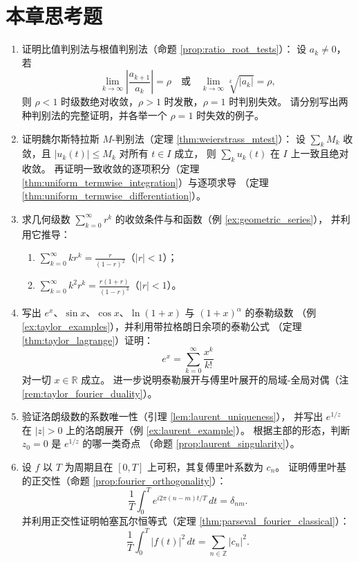\section*{本章思考题}

\begin{enumerate}[leftmargin=3em, label=\textbf{题 \arabic*}]
    \item 证明比值判别法与根值判别法（命题 \ref{prop:ratio_root_tests}）：
    设 $a_k\neq0$，若
    \[
    \lim_{k\to\infty}\left|\frac{a_{k+1}}{a_k}\right|=\rho
    \quad\text{或}\quad
    \lim_{k\to\infty}\sqrt[k]{|a_k|}=\rho,
    \]
    则 $\rho<1$ 时级数绝对收敛，$\rho>1$ 时发散，$\rho=1$ 时判别失效。
    请分别写出两种判别法的完整证明，并各举一个 $\rho=1$ 时失效的例子。

    \item 证明魏尔斯特拉斯 $M$-判别法（定理 \ref{thm:weierstrass_mtest}）：
    设 $\sum_k M_k$ 收敛，且 $|u_k(t)|\le M_k$ 对所有 $t\in I$ 成立，
    则 $\sum_k u_k(t)$ 在 $I$ 上一致且绝对收敛。
    再证明一致收敛的逐项积分（定理 \ref{thm:uniform_termwise_integration}）与逐项求导
    （定理 \ref{thm:uniform_termwise_differentiation}）。

    \item 求几何级数 $\sum_{k=0}^{\infty}r^k$ 的收敛条件与和函数（例 \ref{ex:geometric_series}），
    并利用它推导：
    \begin{enumerate}[label=(\roman*)]
        \item $\displaystyle \sum_{k=0}^{\infty}kr^k=\frac{r}{(1-r)^2}$（$|r|<1$）；
        \item $\displaystyle \sum_{k=0}^{\infty}k^2r^k=\frac{r(1+r)}{(1-r)^3}$（$|r|<1$）。
    \end{enumerate}

    \item 写出 $e^x$、$\sin x$、$\cos x$、$\ln(1+x)$ 与 $(1+x)^\alpha$ 的泰勒级数
    （例 \ref{ex:taylor_examples}），并利用带拉格朗日余项的泰勒公式
    （定理 \ref{thm:taylor_lagrange}）证明：
    \[
    e^x=\sum_{k=0}^{\infty}\frac{x^k}{k!}
    \]
    对一切 $x\in\mathbb{R}$ 成立。
    进一步说明泰勒展开与傅里叶展开的局域-全局对偶（注 \ref{rem:taylor_fourier_duality}）。

    \item 验证洛朗级数的系数唯一性（引理 \ref{lem:laurent_uniqueness}），
    并写出 $e^{1/z}$ 在 $|z|>0$ 上的洛朗展开（例 \ref{ex:laurent_example}）。
    根据主部的形态，判断 $z_0=0$ 是 $e^{1/z}$ 的哪一类奇点
    （命题 \ref{prop:laurent_singularity}）。

    \item 设 $f$ 以 $T$ 为周期且在 $[0,T]$ 上可积，其复傅里叶系数为 $c_n$。
    证明傅里叶基的正交性（命题 \ref{prop:fourier_orthogonality}）：
    \[
    \frac{1}{T}\int_0^T e^{i2\pi(n-m)t/T}\,dt=\delta_{nm}.
    \]
    并利用正交性证明帕塞瓦尔恒等式（定理 \ref{thm:parseval_fourier_classical}）：
    \[
    \frac{1}{T}\int_0^T|f(t)|^2\,dt=\sum_{n\in\mathbb{Z}}|c_n|^2.
    \]


\end{enumerate}
